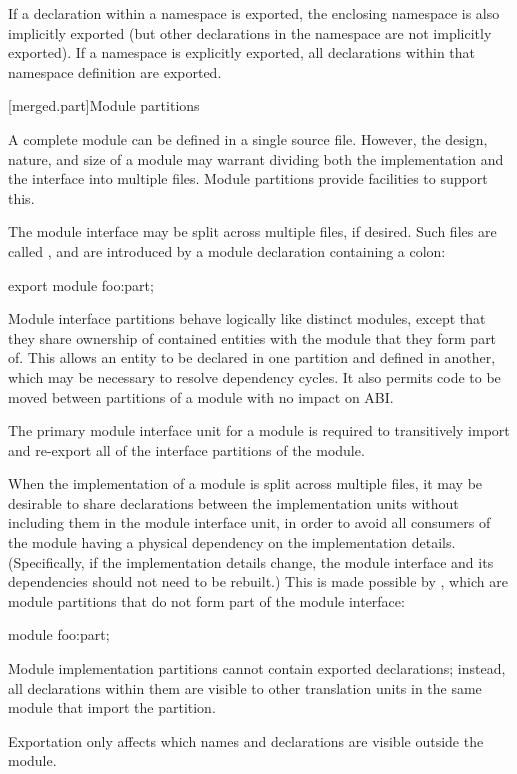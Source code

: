 \pnum
If a declaration within a namespace is exported,
the enclosing namespace is also implicitly exported
(but other declarations in the namespace are not implicitly exported).
If a namespace is explicitly exported,
all declarations within that namespace definition are exported.

[merged.part]{Module partitions}

\pnum
A complete module can be defined in a single source file.
However, the design, nature, and size of a module may warrant
dividing both the implementation and the interface
into multiple files.
Module partitions provide facilities to support this.

\pnum
The module interface may be split across multiple files,
if desired.
Such files are called , and are
introduced by a module declaration containing a colon:

\begin{codeblock}
export module foo:part;
\end{codeblock}

\pnum
Module interface partitions behave logically like distinct modules,
except that they share ownership of contained entities
with the module that they form part of.
This allows an entity to be declared in one partition
and defined in another,
which may be necessary to resolve
dependency cycles.
It also permits code to be moved between partitions of a module
with no impact on ABI.

\pnum
The primary module interface unit for a module is required
to transitively import and re-export all of the interface
partitions of the module.

\pnum
When the implementation of a module is split across multiple files,
it may be desirable to share declarations between the implementation units
without including them in the module interface unit,
in order to avoid all consumers of the module
having a physical dependency on the implementation details.
(Specifically, if the implementation details change,
the module interface and its dependencies should not need to be rebuilt.)
This is made possible by ,
which are module partitions that do not form part of the module interface:

\begin{codeblock}
module foo:part;
\end{codeblock}

\pnum
Module implementation partitions cannot contain exported declarations;
instead, all declarations within them are visible to other translation
units in the same module that import the partition.
\begin{note}
Exportation only affects which names and declarations are visible outside
the module.
\end{note}


